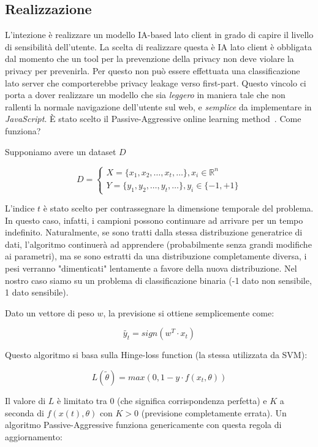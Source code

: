 \subsection{Realizzazione}
L'intezione è realizzare un modello IA-based lato client in grado di capire il livello di sensibilità dell'utente. La scelta di realizzare questa è IA lato client è obbligata dal momento che un tool per la prevenzione della privacy non deve violare la privacy per prevenirla. Per questo non può essere effettuata una classificazione lato server che comporterebbe privacy leakage verso first-part. Questo vincolo ci porta a dover realizzare un modello che sia \textit{leggero} in maniera tale che non rallenti la normale navigazione dell'utente sul web, e \textit{semplice} da implementare in \textit{JavaScript}. È stato scelto il Passive-Aggressive online learning method~\cite{PAalgo}. Come funziona?

Supponiamo avere un dataset $D$

$$D=\left\{
                \begin{array}{ll}
                  X=\{x_1,x_2,\dots ,x_t,\dots \}, x_i \in \mathbb{R}^n \\
                  Y=\{y_1,y_2,\dots ,y_t,\dots\}, y_i \in \{-1,+1\}
                \end{array}
              \right.$$

L'indice $t$ è stato scelto per contrassegnare la dimensione temporale del problema. In questo caso, infatti, i campioni possono continuare ad arrivare per un tempo indefinito. Naturalmente, se sono tratti dalla stessa distribuzione generatrice di dati, l'algoritmo continuerà ad apprendere (probabilmente senza grandi modifiche ai parametri), ma se sono estratti da una distribuzione completamente diversa, i pesi verranno "dimenticati" lentamente a favore della nuova distribuzione. Nel nostro caso siamo su un problema di classificazione binaria (-1 dato non sensibile, 1 dato sensibile).

Dato un vettore di peso $w$, la previsione si ottiene semplicemente come:

$$\tilde{y_t}=sign(w^T\cdot x_t)$$

Questo algoritmo si basa sulla Hinge-loss function (la stessa utilizzata da SVM):

$$L(\tilde{\theta})=max(0,1-y\cdot f(x_t,\theta))$$

Il valore di $L$ è limitato tra $0$ (che significa corrispondenza perfetta) e $K$ a seconda di $f(x(t), \theta)$ con $K > 0$ (previsione completamente errata). Un algoritmo Passive-Aggressive funziona genericamente con questa regola di aggiornamento:

